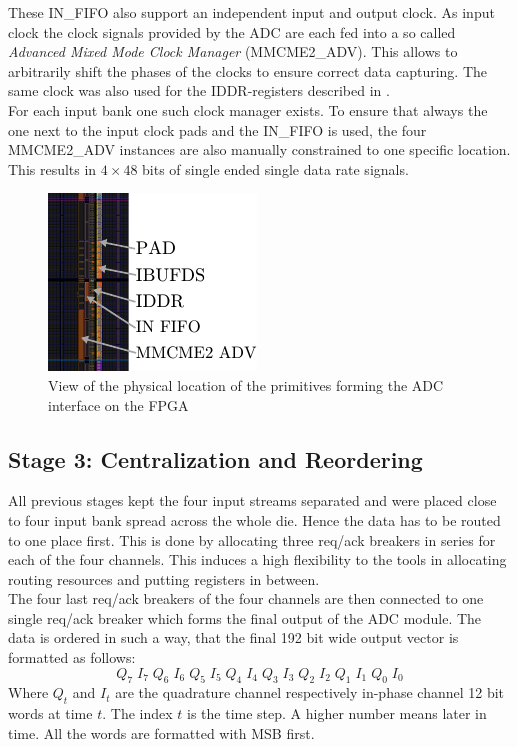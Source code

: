 These IN\_FIFO also support an independent input and output clock.
As input clock the clock signals provided by the \gls{ADC} are each fed
into a so called {\em Advanced Mixed Mode Clock Manager} (MMCME2\_ADV).
This allows to arbitrarily shift the phases of the clocks to ensure
correct data capturing. The same clock was also used for the
IDDR-registers described in . \\

For each input bank one such clock manager exists. To ensure that
always the one next to the input clock pads and the IN\_FIFO is
used, the four MMCME2\_ADV instances are also manually constrained to
one specific location. \\

This results in $4 \times 48$ bits of single ended single data rate signals. \\

\begin{figure}
  \centering
  \includegraphics{figures/adc_input_bank}
  \caption{View of the physical location of the primitives forming the
    \gls{ADC} interface on the \gls{FPGA}}
  \label{fig:adc_input_bank}
\end{figure}

\subsection{Stage 3: Centralization and Reordering}
\label{sec:fpga_adc_s3}
All previous stages kept the four input streams separated
and were placed close to four input bank spread across the whole die.
Hence the data has to be routed to one place first.
This is done by allocating three req/ack breakers in series for each of the
four channels.
This induces a high flexibility to the tools in allocating routing
resources and putting registers in between. \\

The four last \gls{req}/\gls{ack} breakers of the four channels are then connected
to one single \gls{req}/\gls{ack} breaker which forms the final output of the
\gls{ADC} module. The data is ordered in such a way, that the final 192 bit
wide output vector is formatted as follows:
\[Q_7\;I_7\;Q_6\;I_6\;Q_5\;I_5\;Q_4\;I_4\;Q_3\;I_3\;Q_2\;I_2\;Q_1\;I_1\;Q_0\;I_0\]
Where $Q_t$ and $I_t$ are the quadrature channel respectively in-phase channel
12 bit words at time $t$.
The index $t$ is the time step. A higher number means later in time.
All the words are formatted with \gls{MSB} first. \\

